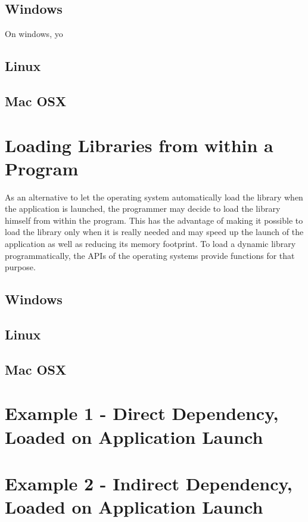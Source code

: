 \subsection{Windows}
On windows, yo

\subsection{Linux}

\subsection{Mac OSX}



\section{Loading Libraries from within a Program}
As an alternative to let the operating system automatically load the library when the application is launched, the programmer may decide to load the library himself from within the program. This has the advantage of making it possible to load the library only when it is really needed and may speed up the launch of the application as well as reducing its memory footprint. To load a dynamic library programmatically, the APIs of the operating systems provide functions for that purpose.

\subsection{Windows}

\subsection{Linux}

\subsection{Mac OSX}




\section{Example 1 - Direct Dependency, Loaded on Application Launch}


\section{Example 2 - Indirect Dependency, Loaded on Application Launch}









